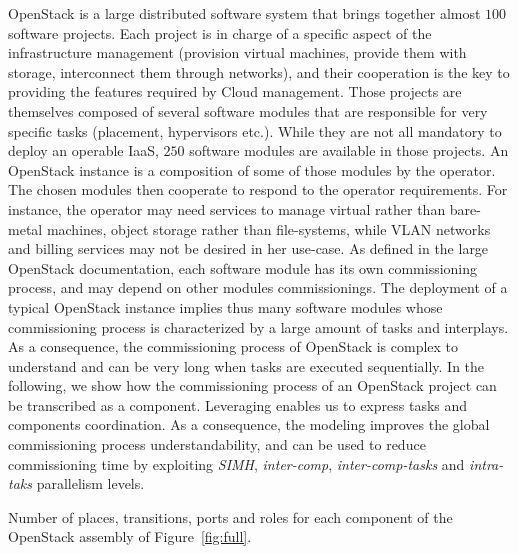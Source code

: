 OpenStack is a large distributed software system that brings together
almost $100$ software projects. Each project is in charge of a
specific aspect of the infrastructure management (\eg provision
virtual machines, provide them with storage, interconnect them through
networks), and their cooperation is the key to providing the features
required by Cloud management.
%
Those projects are themselves composed of several software modules
that are responsible for very specific tasks (\eg placement,
hypervisors etc.). While they are not all mandatory to deploy an
operable IaaS, $250$ software modules are available in those projects.
%
An OpenStack instance is a composition of some of those modules by the
operator. The chosen modules then cooperate to respond to the operator
requirements. For instance, the operator may need services to manage
virtual rather than bare-metal machines, object storage rather than
file-systems, while VLAN networks and billing services may not be
desired in her use-case. As defined in the large OpenStack
documentation, each software module has its own commissioning process,
and may depend on other modules commissionings.
%
The deployment of a typical OpenStack instance implies thus many
software modules whose commissioning process is characterized by a
large amount of tasks and interplays. As a consequence, the
commissioning process of OpenStack is complex to understand and can be
very long when tasks are executed sequentially.
%
In the following, we show how the commissioning process of an
OpenStack project can be transcribed as a \mad component. Leveraging
\mad enables us to express tasks and components coordination. As a
consequence, the \mad modeling improves the global commissioning
process understandability, and can be used to reduce commissioning
time by exploiting \emph{SIMH}, \emph{inter-comp}, \emph{inter-comp-tasks}
and \emph{intra-taks} parallelism levels.

\begin{table}
  \begin{center}
    
    \caption{Number of places, transitions, ports and roles for each \mad component
        of the OpenStack assembly of Figure~\ref{fig:full}.}
    \label{tab:os}
  \end{center}
\end{table}

